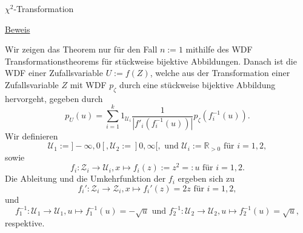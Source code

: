 \documentclass[
  8pt,
  ignorenonframetext,
]{beamer}
\begin{document}
\begin{frame}{\(\chi^2\)-Transformation}
\protect\hypertarget{chi2-transformation-4}{}
\footnotesize

\underline{Beweis} \vspace{1mm}

Wir zeigen das Theorem nur für den Fall \(n := 1\) mithilfe des WDF
Transformationstheorems für stückweise bijektive Abbildungen. Danach ist
die WDF einer Zufallsvariable \(U := f(Z)\), welche aus der
Transformation einer Zufallsvariable \(Z\) mit WDF \(p_\zeta\) durch
eine stückweise bijektive Abbildung hervorgeht, gegeben durch
\begin{equation}\label{eq:piecewise_pdf_transform}
p_U(u) = \sum_{i=1}^k 1_{\mathcal{U}_i} \frac{1}{|f'_i(f_i^{-1}(u))|}p_\zeta\left(f_i^{-1} (u)\right).
\end{equation} Wir definieren \begin{equation}
\mathcal{U}_1 := ]-\infty,0[,
\mathcal{U}_2 := ]0,\infty[, \mbox{ und }
\mathcal{U}_i := \mathbb{R}_{>0} \mbox{ für } i = 1,2,
\end{equation} sowie \begin{equation}
f_i : \mathcal{Z}_i \to \mathcal{U}_i, x \mapsto f_i(z) := z^2 =: u \mbox{ für } i = 1,2.
\end{equation} Die Ableitung und die Umkehrfunktion der \(f_i\) ergeben
sich zu \begin{equation}
f_i' : \mathcal{Z}_i \to \mathcal{Z}_i, x \mapsto f_i'(z) = 2z \mbox{ für } i = 1,2,
\end{equation} und \begin{equation}
f_1^{-1} : \mathcal{U}_1 \to \mathcal{U}_1, u \mapsto f_1^{-1}(u) = - \sqrt{u}
\mbox{ und }
f_2^{-1} : \mathcal{U}_2 \to \mathcal{U}_2, u \mapsto f_2^{-1}(u) = \sqrt{u},
\end{equation} respektive.
\end{frame}
\end{document}
